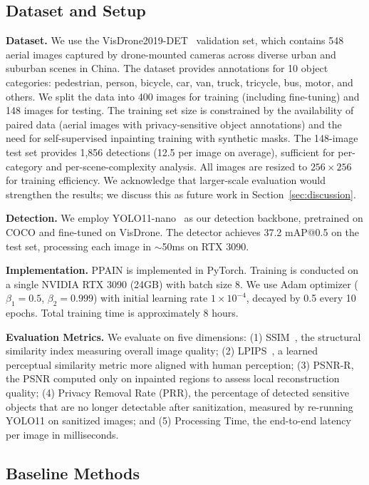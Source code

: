 \documentclass[preprint,12pt]{elsarticle}
\begin{document}
\subsection{Dataset and Setup}

\textbf{Dataset.} We use the VisDrone2019-DET~\cite{visdrone2019} validation set, which contains 548 aerial images captured by drone-mounted cameras across diverse urban and suburban scenes in China. The dataset provides annotations for 10 object categories: pedestrian, person, bicycle, car, van, truck, tricycle, bus, motor, and others. We split the data into 400 images for training (including fine-tuning) and 148 images for testing. The training set size is constrained by the availability of paired data (aerial images with privacy-sensitive object annotations) and the need for self-supervised inpainting training with synthetic masks. The 148-image test set provides 1,856 detections (12.5 per image on average), sufficient for per-category and per-scene-complexity analysis. All images are resized to $256 \times 256$ for training efficiency. We acknowledge that larger-scale evaluation would strengthen the results; we discuss this as future work in Section~\ref{sec:discussion}.

\textbf{Detection.} We employ YOLO11-nano~\cite{ultralytics2024yolo} as our detection backbone, pretrained on COCO and fine-tuned on VisDrone. The detector achieves 37.2 mAP@0.5 on the test set, processing each image in $\sim$50ms on RTX 3090.

\textbf{Implementation.} PPAIN is implemented in PyTorch. Training is conducted on a single NVIDIA RTX 3090 (24GB) with batch size 8. We use Adam optimizer ($\beta_1=0.5$, $\beta_2=0.999$) with initial learning rate $1 \times 10^{-4}$, decayed by 0.5 every 10 epochs. Total training time is approximately 8 hours.

\textbf{Evaluation Metrics.} We evaluate on five dimensions: (1) SSIM~\cite{wang2004image}, the structural similarity index measuring overall image quality; (2) LPIPS~\cite{zhang2018unreasonable}, a learned perceptual similarity metric more aligned with human perception; (3) PSNR-R, the PSNR computed only on inpainted regions to assess local reconstruction quality; (4) Privacy Removal Rate (PRR), the percentage of detected sensitive objects that are no longer detectable after sanitization, measured by re-running YOLO11 on sanitized images; and (5) Processing Time, the end-to-end latency per image in milliseconds.

\subsection{Baseline Methods}
\end{document}
